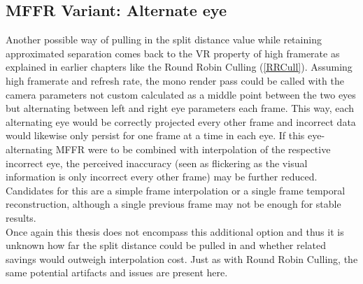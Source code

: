 \subsection{\gls{MFFR} Variant: Alternate eye}
Another possible way of pulling in the split distance value while retaining approximated separation comes back to the \gls{VR} property of high framerate as explained in earlier chapters like the Round Robin Culling (\autoref{RRCull}). Assuming high framerate and refresh rate, the mono render pass could be called with the camera parameters not custom calculated as a middle point between the two eyes but alternating between left and right eye parameters each frame. This way, each alternating eye would be correctly projected every other frame and incorrect data would likewise only persist for one frame at a time in each eye. If this eye-alternating \gls{MFFR} were to be combined with interpolation of the respective incorrect eye, the perceived inaccuracy (seen as flickering as the visual information is only incorrect every other frame) may be further reduced. Candidates for this are a simple frame interpolation or a single frame temporal reconstruction, although a single previous frame may not be enough for stable results. \\
Once again this thesis does not encompass this additional option and thus it is unknown how far the split distance could be pulled in and whether related savings would outweigh interpolation cost. Just as with Round Robin Culling, the same potential artifacts and issues are present here. 